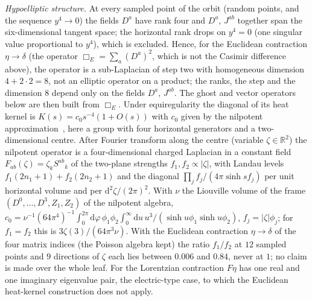 \emph{Hypoelliptic structure.} At every sampled point of the orbit (random points, and the sequence \(y^4\to0\)) the fields \(D^a\) have rank four and \(D^a\), \(J^{ab}\) together span the six-dimensional tangent space; the horizontal rank drops on \(y^4=0\) (one singular value proportional to \(y^4\)), which is excluded. Hence, for the Euclidean contraction \(\eta\to\delta\) (the operator \(\Box_E=\sum_a(D^a)^2\), which is not the Casimir difference above), the operator is a sub-Laplacian of step two with homogeneous dimension \(4+2\cdot2=8\), not an elliptic operator on a product; the ranks, the step and the dimension \(8\) depend only on the fields \(D^a\), \(J^{ab}\). The ghost and vector operators below are then built from \(\Box_E\). Under equiregularity the diagonal of its heat kernel is \(K(s)=c_0s^{-4}(1+O(s))\) with \(c_0\) given by the nilpotent approximation~\cite{BenArous1989}, here a group with four horizontal generators and a two-dimensional centre. After Fourier transform along the centre (variable \(\zeta\in\mathbb R^2\)) the nilpotent operator is a four-dimensional charged Laplacian in a constant field \(F_{ab}(\zeta)=\zeta_kS^{ab}{}_k\) of the two-plane strengths \(f_1,f_2\propto|\zeta|\), with Landau levels \(f_1(2n_1+1)+f_2(2n_2+1)\) and the diagonal \(\prod_j f_j/(4\pi\sinh sf_j)\) per unit horizontal volume and per \(\mathrm d^2\zeta/(2\pi)^2\). With \(\nu\) the Liouville volume of the frame \((D^0,\dots,D^3,Z_1,Z_2)\) of the nilpotent algebra, \(c_0=\nu^{-1}(64\pi^4)^{-1}\!\int_0^{2\pi}\!\mathrm d\varphi\,\phi_1\phi_2\!\int_0^\infty\!\mathrm du\,u^3/(\sinh u\phi_1\sinh u\phi_2)\), \(f_j=|\zeta|\phi_j\); for \(f_1=f_2\) this is \(3\zeta(3)/(64\pi^3\nu)\). With the Euclidean contraction \(\eta\to\delta\) of the four matrix indices (the Poisson algebra kept) the ratio \(f_1/f_2\) at \(12\) sampled points and \(9\) directions of \(\zeta\) each lies between \(0.006\) and \(0.84\), never at \(1\); no claim is made over the whole leaf. For the Lorentzian contraction \(F\eta\) has one real and one imaginary eigenvalue pair, the electric-type case, to which the Euclidean heat-kernel construction does not apply.



